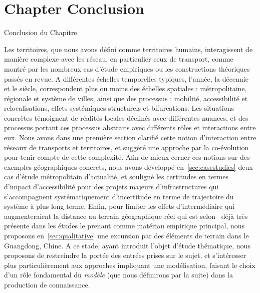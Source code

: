 





\newpage


\section*{Chapter Conclusion}{Conclusion du Chapitre}


Les territoires, que nous avons défini comme territoires humains, interagissent de manière complexe avec les réseau, en particulier ceux de transport, comme montré par les nombreux cas d'étude empiriques ou les constructions théoriques passés en revue. A différentes échelles temporelles typiques, l'année, la décennie et le siècle, correspondent plus ou moins des échelles spatiales : métropolitaine, régionale et système de villes, ainsi que des processus : mobilité, accessibilité et relocalisations, effets systémiques structurels et bifurcations. Les situations concrètes témoignent de réalités locales déclinés avec différentes nuances, et des processus portant ces processus abstraits avec différents rôles et interactions entre eux. Nous avons dans une première section clarifié cette notion d'interaction entre réseaux de transports et territoires, et suggéré une approche par la co-évolution pour tenir compte de cette complexité. Afin de mieux cerner ces notions sur des exemples géographiques concrets, nous avons développé en~\ref{sec:casestudies} deux cas d'étude métropolitain d'actualité, et souligné les certitudes en termes d'impact d'accessibilité pour des projets majeurs d'infrastructures qui s'accompagnent systématiquement d'incertitude en terme de trajectoire du système à plus long terme. Enfin, pour limiter les effets d'intermédiaire qui augmenteraient la distance au terrain géographique réel qui est selon~\cite{lefort2012terrain} déjà très présente dans les études le prenant comme matériau empirique principal, nous proposons en~\ref{sec:qualitative} une excursion par des éléments de terrain dans le Guangdong, Chine. A ce stade, ayant introduit l'objet d'étude thématique, nous proposons de restreindre la portée des entrées prises sur le sujet, et s'intéresser plus particulièrement aux approches impliquant une modélisation, faisant le choix d'un rôle fondamental du \emph{modèle} (que nous définirons par la suite) dans la production de connaissance.





